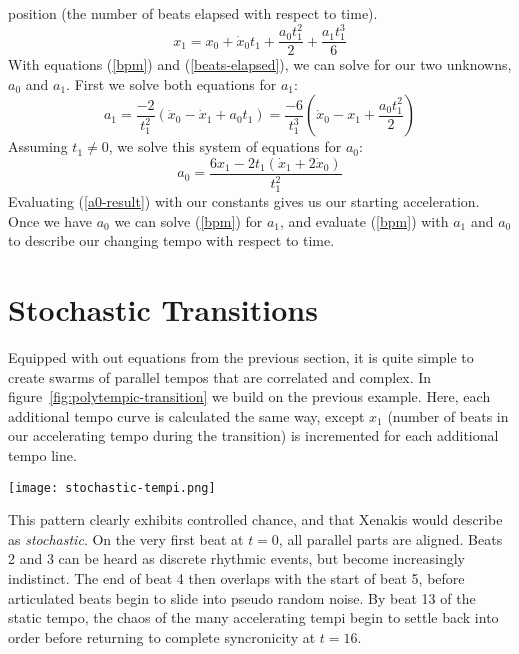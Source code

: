 position (the number of beats elapsed with respect to time).
\begin{equation}
	\label{beats-elapsed}
	x_1 = x_0 + \dot{x}_0t_1 + \frac{a_0t_1^2}{2} + \frac{a_1t_1^3}{6}
\end{equation}
With equations (\ref{bpm}) and (\ref{beats-elapsed}), we can solve for our 
two unknowns, $a_0$ and $a_1$. First we solve both equations for $a_1$:
\begin{displaymath}
    \label{a1-solution}
    a_1=
    \frac{-2}{t_1^2}(\dot{x}_0-\dot{x}_1 + a_0t_1)=
    \frac{-6}{t_1^3}(\dot{x}_0-x_1 + \frac{a_0t_1^2}{2})
\end{displaymath}
Assuming $t_1 \neq 0$, we solve this system of equations for $a_0$:
\begin{equation}
	\label{a0-result}
	a_0=\frac{6x_1-2t_1(\dot{x}_1+2\dot{x}_0)}{t_1^2}
\end{equation}
Evaluating (\ref{a0-result}) with our constants gives us our starting
acceleration. Once we have $a_0$ we can solve (\ref{bpm}) for $a_1$, and 
evaluate (\ref{bpm}) with $a_1$ and $a_0$ to describe our changing tempo 
with respect to time.

\section{Stochastic Transitions}
\label{sec:polytempic-implementation}
Equipped with out equations from the previous section, it is quite
simple to create swarms of parallel tempos that are correlated and
complex. In figure~\ref{fig:polytempic-transition} we build on the
previous example. Here, each additional tempo curve is calculated the
same way, except $x_1$ (number of beats in our accelerating tempo
during the transition) is incremented for each additional tempo line. 
\begin{figure*}[h!]
  \texttt{[image: stochastic-tempi.png]}
  \caption{Stochastic Tempo Transition from 90~BPM to 120~BPM. Black
    dots are beats in our changing tempi. Grey dots show a
    continuation of beats at the initial tempo.
    $12 \leq x_1 \leq 20$}
  \label{fig:polytempic-transition}
\end{figure*}\hfill\break
This pattern clearly exhibits controlled chance, and that Xenakis
would describe as \emph{stochastic}. On the very first beat at $t=0$,
all parallel parts are aligned. Beats 2 and 3 can be heard as discrete
rhythmic events, but become increasingly indistinct. The end of beat 4
then overlaps with the start of beat 5, before articulated beats begin
to slide into pseudo random noise. By beat 13 of the static tempo, the
chaos of the many accelerating tempi begin to settle back into order
before returning to complete syncronicity at $t=16$.

